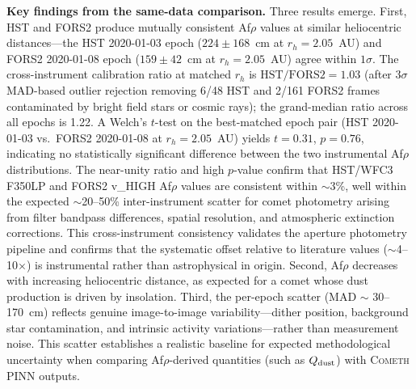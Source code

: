 \documentclass[usenatbib]{mnras}
\begin{document}
\textbf{Key findings from the same-data comparison.} Three results emerge. First, HST and FORS2 produce mutually consistent Af$\rho$ values at similar heliocentric distances---the HST 2020-01-03 epoch ($224\pm168$~cm at $r_h=2.05$~AU) and FORS2 2020-01-08 epoch ($159\pm42$~cm at $r_h=2.05$~AU) agree within $1\sigma$. The cross-instrument calibration ratio at matched $r_h$ is $\text{HST/FORS2} = 1.03$ (after $3\sigma$ MAD-based outlier rejection removing 6/48 HST and 2/161 FORS2 frames contaminated by bright field stars or cosmic rays); the grand-median ratio across all epochs is 1.22. A Welch's $t$-test on the best-matched epoch pair (HST 2020-01-03 vs.\ FORS2 2020-01-08 at $r_h=2.05$~AU) yields $t = 0.31$, $p = 0.76$, indicating no statistically significant difference between the two instrumental Af$\rho$ distributions. The near-unity ratio and high $p$-value confirm that HST/WFC3 F350LP and FORS2 v\_HIGH Af$\rho$ values are consistent within $\sim$3\%, well within the expected $\sim$20--50\% inter-instrument scatter for comet photometry arising from filter bandpass differences, spatial resolution, and atmospheric extinction corrections. This cross-instrument consistency validates the aperture photometry pipeline and confirms that the systematic offset relative to literature values ($\sim$4--10$\times$) is instrumental rather than astrophysical in origin. Second, Af$\rho$ decreases with increasing heliocentric distance, as expected for a comet whose dust production is driven by insolation. Third, the per-epoch scatter (MAD $\sim$ 30--170~cm) reflects genuine image-to-image variability---dither position, background star contamination, and intrinsic activity variations---rather than measurement noise. This scatter establishes a realistic baseline for expected methodological uncertainty when comparing Af$\rho$-derived quantities (such as $Q_{\rm dust}$) with \textsc{Cometh} PINN outputs.
\end{document}
